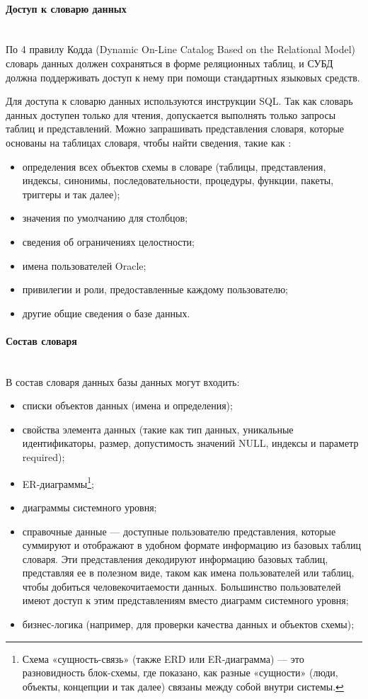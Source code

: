 \paragraph{Доступ к словарю данных} ~\\

По 4 правилу Кодда (Dynamic On-Line Catalog Based on the Relational Model) словарь данных должен сохраняться в форме реляционных
таблиц, и СУБД должна поддерживать доступ к нему при
помощи стандартных языковых средств.

Для доступа к словарю данных используются инструкции SQL. Так как словарь данных доступен только для чтения, допускается выполнять только запросы таблиц и представлений.
Можно запрашивать представления словаря, которые основаны на таблицах словаря, чтобы найти сведения, такие как \autocite{SqlOracle}:
\begin{itemize}
\item определения всех объектов схемы в словаре (таблицы, представления, индексы, синонимы, последовательности, процедуры, функции, пакеты, триггеры и так далее);
\item значения по умолчанию для столбцов;
\item сведения об ограничениях целостности;
\item имена пользователей Oracle;
\item привилегии и роли, предоставленные каждому пользователю;
\item другие общие сведения о базе данных.
\end{itemize}

\paragraph{Состав словаря} ~\\

В состав словаря данных базы данных могут входить: \autocite{DataDictionary}
\begin{itemize}
\item списки объектов данных (имена и определения);
\item свойства элемента данных (такие как тип данных, уникальные идентификаторы, размер, допустимость значений NULL, индексы и параметр required);
\item ER-диаграммы\footnote{Схема «сущность-связь» (также ERD или ER-диаграмма) — это разновидность блок-схемы, где показано, как разные «сущности» (люди, объекты, концепции и так далее) связаны между собой внутри системы.};
\item диаграммы системного уровня;
\item справочные данные — доступные пользователю представления, которые
суммируют и отображают в удобном формате информацию из базовых таблиц словаря. Эти представления декодируют информацию базовых таблиц, представляя ее в полезном виде, таком как имена пользователей или таблиц, чтобы добиться человекочитаемости данных. Большинство пользователей имеют доступ к этим представлениям вместо диаграмм системного уровня;
\item бизнес-логика (например, для проверки качества данных и объектов схемы);
\end{itemize}

